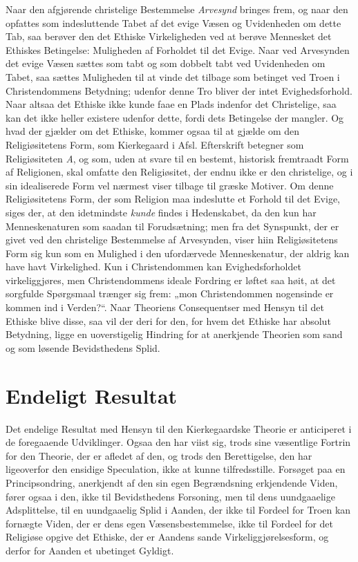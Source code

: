 \documentclass[12pt,a4paper]{book}
\newcommand{\opage}[1]{\marginnote{\footnotesize\textit{[#1]}}}
\begin{document}
Naar den afgjørende christelige Bestemmelse \emph{Arvesynd} bringes frem, og naar den opfattes som
indesluttende Tabet af det evige Væsen og Uvidenheden om dette Tab, saa berøver den det Ethiske
Virkeligheden ved at berøve Mennesket det Ethiskes Betingelse: Muligheden af Forholdet til det
Evige. Naar ved Arvesynden det evige Væsen sættes som tabt og som dobbelt tabt ved Uvidenheden om
Tabet, saa sættes Muligheden til at vinde det tilbage som betinget ved Troen i Christendommens
Betydning; udenfor denne Tro bliver der intet Evighedsforhold. Naar altsaa det Ethiske ikke kunde
faae en Plads indenfor det Christelige, saa kan det ikke heller existere udenfor dette, fordi
dets Betingelse der mangler. Og hvad der gjælder om det Ethiske, kommer ogsaa til at gjælde om
den Religiøsitetens Form, som Kierkegaard i Afsl. Efterskrift betegner som Religiøsiteten \textit{A}, og som, uden at svare til en bestemt, historisk fremtraadt Form af Religionen, skal omfatte den
Religiøsitet, der endnu ikke er den christelige, og i sin idealiserede Form vel nærmest viser
tilbage til græske Motiver. Om denne Religiøsitetens Form, der som Religion maa indeslutte et
Forhold til det Evige, siges der, at den idetmindste \emph{kunde} \opage{224}findes i Hedenskabet, da den kun har
Menneskenaturen som saadan til Forudsætning; men fra det Synspunkt, der er givet ved den
christelige Bestemmelse af Arvesynden, viser hiin Religiøsitetens Form sig kun som en Mulighed i
den ufordærvede Menneskenatur, der aldrig kan have havt Virkelighed. Kun i Christendommen kan
Evighedsforholdet virkeliggjøres, men Christendommens ideale Fordring er løftet saa høit, at det
sorgfulde Spørgsmaal trænger sig frem: „mon Christendommen nogensinde er kommen ind i Verden?“.
Naar Theoriens Consequentser med Hensyn til det Ethiske blive disse, saa vil der deri for den,
for hvem det Ethiske har absolut Betydning, ligge en uoverstigelig Hindring for at anerkjende
Theorien som sand og som løsende Bevidsthedens Splid.

\section{Endeligt Resultat}
\label{sec:sondring-resultat}

Det endelige Resultat med Hensyn til den Kierkegaardske Theorie er anticiperet i de
foregaaende Udviklinger. Ogsaa den har viist sig, trods sine væsentlige Fortrin for den
Theorie, der er afledet af den, og trods den Berettigelse, den har ligeoverfor den ensidige
Speculation, ikke at kunne tilfredsstille. Forsøget paa en Principsondring, anerkjendt af den
sin egen Begrændsning erkjendende Viden, fører ogsaa i den, ikke til Bevidsthedens Forsoning,
men til dens uundgaaelige Adsplittelse, til en uundgaaelig Splid i Aanden, der ikke til
Fordeel for Troen kan fornægte Viden, der er dens egen Væsensbestemmelse, ikke til Fordeel
for det Religiøse opgive det Ethiske, der er Aandens sande Virkeliggjørelsesform, og derfor
for Aanden et ubetinget Gyldigt.
\end{document}

